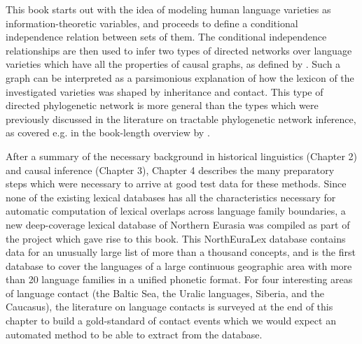 \addchap{\lsPrefaceTitle}
 
This book starts out with the idea of modeling human language varieties as information-theoretic variables, and proceeds to define a conditional independence relation between sets of them. The conditional independence relationships are then used to infer two types of directed networks over language varieties which have all the properties of causal graphs, as defined by \cite{pearl2009}. Such a graph can be interpreted as a parsimonious explanation of how the lexicon of the investigated varieties was shaped by inheritance and contact. This type of directed phylogenetic network is more general than the types which were previously discussed in the literature on tractable phylogenetic network inference, as covered e.g. in the book-length overview by \cite{morrison2011}.

After a summary of the necessary background in historical linguistics (Chapter 2) and causal inference (Chapter 3), Chapter 4 describes the many preparatory steps which were necessary to arrive at good test data for these methods. Since none of the existing lexical databases has all the characteristics necessary for automatic computation of lexical overlaps across language family boundaries, a new deep-coverage lexical database of Northern Eurasia was compiled as part of the project which gave rise to this book. This NorthEuraLex database contains data for an unusually large list of more than a thousand concepts, and is the first database to cover the languages of a large continuous geographic area with more than 20 language families in a unified phonetic format. For four interesting areas of language contact (the Baltic Sea, the Uralic languages, Siberia, and the Caucasus), the literature on language contacts is surveyed at the end of this chapter to build a gold-standard of contact events which we would expect an automated method to be able to extract from the database.

